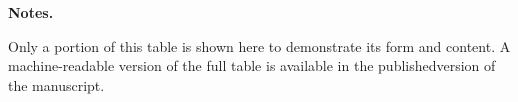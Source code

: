 \begin{landscape}
\begin{table*}
\begin{tabular}{cccccccccccccccccc}
\end{tabular}
\begin{list}{}{}
\item {\bf{Notes.}}
\item Only a portion of this table is shown here to demonstrate its form and content. A machine-readable version of the full table is available in the publishedversion of the manuscript.
\end{list}
\end{table*}
\clearpage
\end{landscape}
